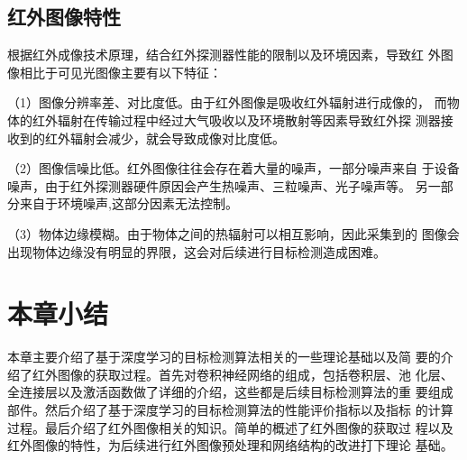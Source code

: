 \subsection{红外图像特性} 
根据红外成像技术原理，结合红外探测器性能的限制以及环境因素，导致红
外图像相比于可见光图像主要有以下特征：

（1）图像分辨率差、对比度低。由于红外图像是吸收红外辐射进行成像的，
而物体的红外辐射在传输过程中经过大气吸收以及环境散射等因素导致红外探
测器接收到的红外辐射会减少，就会导致成像对比度低。

（2）图像信噪比低。红外图像往往会存在着大量的噪声，一部分噪声来自
于设备噪声，由于红外探测器硬件原因会产生热噪声、三粒噪声、光子噪声等。
另一部分来自于环境噪声,这部分因素无法控制。

（3）物体边缘模糊。由于物体之间的热辐射可以相互影响，因此采集到的
图像会出现物体边缘没有明显的界限，这会对后续进行目标检测造成困难。

\section{本章小结}
本章主要介绍了基于深度学习的目标检测算法相关的一些理论基础以及简
要的介绍了红外图像的获取过程。首先对卷积神经网络的组成，包括卷积层、池
化层、全连接层以及激活函数做了详细的介绍，这些都是后续目标检测算法的重
要组成部件。然后介绍了基于深度学习的目标检测算法的性能评价指标以及指标
的计算过程。最后介绍了红外图像相关的知识。简单的概述了红外图像的获取过
程以及红外图像的特性，为后续进行红外图像预处理和网络结构的改进打下理论
基础。
